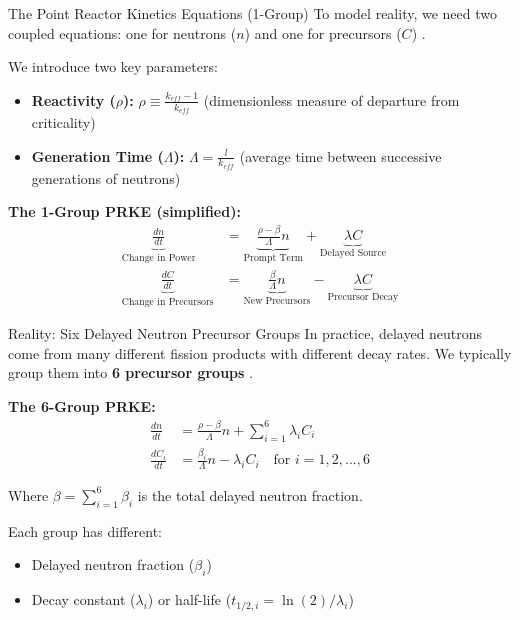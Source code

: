\documentclass[aspectratio=169]{beamer}
\begin{document}
\begin{frame}[allowframebreaks]{The Point Reactor Kinetics Equations (1-Group)}
    To model reality, we need two coupled equations: one for neutrons ($n$) and one for precursors ($C$) \cite{bell1970nuclear}.

    We introduce two key parameters:
    \begin{itemize}
        \item \textbf{Reactivity ($\rho$):} $\rho \equiv \frac{k_{eff} - 1}{k_{eff}}$ (dimensionless measure of departure from criticality)
        \item \textbf{Generation Time ($\Lambda$):} $\Lambda = \frac{l}{k_{eff}}$ (average time between successive generations of neutrons)
    \end{itemize}

    \vspace{1em}
    \textbf{The 1-Group PRKE (simplified):}
    \begin{align*}
        \underbrace{\frac{dn}{dt}}_{\text{Change in Power}} &= \underbrace{\frac{\rho - \beta}{\Lambda}n}_{\text{Prompt Term}} + \underbrace{\lambda C}_{\text{Delayed Source}} \\
        \underbrace{\frac{dC}{dt}}_{\text{Change in Precursors}} &= \underbrace{\frac{\beta}{\Lambda}n}_{\text{New Precursors}} - \underbrace{\lambda C}_{\text{Precursor Decay}}
    \end{align*}
\end{frame}

\begin{frame}[allowframebreaks]{Reality: Six Delayed Neutron Precursor Groups}
    In practice, delayed neutrons come from many different fission products with different decay rates. We typically group them into \textbf{6 precursor groups} \cite{bell1970nuclear}.

    \vspace{1em}
    \textbf{The 6-Group PRKE:}
    \begin{align*}
        \frac{dn}{dt} &= \frac{\rho - \beta}{\Lambda}n + \sum_{i=1}^{6} \lambda_i C_i \\
        \frac{dC_i}{dt} &= \frac{\beta_i}{\Lambda}n - \lambda_i C_i \quad \text{for } i = 1, 2, ..., 6
    \end{align*}

    Where $\beta = \sum_{i=1}^{6} \beta_i$ is the total delayed neutron fraction.

    \vspace{1em}
    Each group has different:
    \begin{itemize}
        \item Delayed neutron fraction ($\beta_i$)
        \item Decay constant ($\lambda_i$) or half-life ($t_{1/2,i} = \ln(2)/\lambda_i$)
    \end{itemize}
\end{frame}
\end{document}
